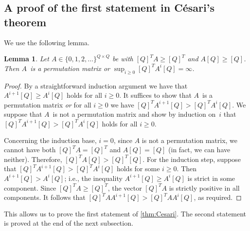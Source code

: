 \documentclass[11pt,a4paper]{amsart}
\theoremstyle{plain}
\newtheorem{lem}[thm]{Lemma}
\theoremstyle{definition}
\theoremstyle{defC}
\theoremstyle{thmC}
\theoremstyle{plain}
\numberwithin{equation}{section}
\begin{document}
\subsection{A proof of the first statement in C{\'{e}}sari's theorem}

We use the following lemma.
\begin{lem} \label{lem:Cesari-lemma}
Let $A \in \{0, 1, 2, \ldots\}^{Q \times Q}$ be with $[Q]^T A \ge [Q]^T$ and $A [Q] \ge [Q]$.
Then $A$~is a permutation matrix \emph{or} $\sup_{i \ge 0} [Q]^T A^i [Q] = \infty$.
\end{lem}
\begin{proof}
By a straightforward induction argument we have that $A^{i+1} [Q] \ge A^i [Q]$ holds for all $i \ge 0$.
It suffices to show that $A$~is a permutation matrix \emph{or} for all $i \ge 0$ we have $[Q]^T A^{i+1} [Q] > [Q]^T A^i [Q]$.
We suppose that $A$~is not a permutation matrix and show by induction on~$i$ that $[Q]^T A^{i+1} [Q] > [Q]^T A^i [Q]$ holds for all $i \ge 0$.

Concerning the induction base, $i=0$, since $A$ is not a permutation matrix, we cannot have both $[Q]^T A = [Q]^T$ and $A [Q] = [Q]$ (in fact, we can have neither).
Therefore, $[Q]^T A [Q] > [Q]^T [Q]$.
For the induction step, suppose that $[Q]^T A^{i+1} [Q] > [Q]^T A^i [Q]$ holds for some $i \ge 0$.
Then $A^{i+1} [Q] > A^i [Q]$; i.e., the inequality $A^{i+1} [Q] \ge A^i [Q]$ is strict in some component.
Since $[Q]^T A \ge [Q]^T$, the vector $[Q]^T A$ is strictly positive in all components.
It follows that $[Q]^T A A^{i+1} [Q] > [Q]^T A A^i [Q]$, as required.
\end{proof}

\noindent
This allows us to prove the first statement of \autoref{thm:Cesari}. The second statement is proved at the end of the next subsection.
\end{document}

